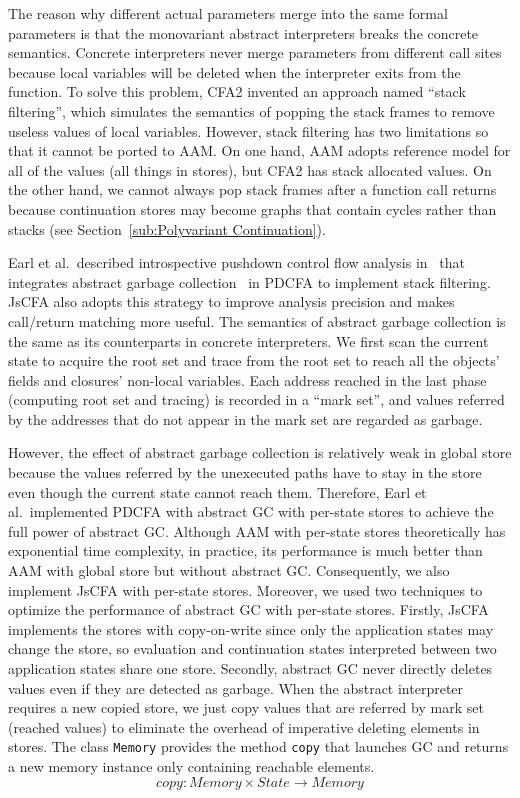 \documentclass[12pt]{report}
\begin{document}
The reason why different actual parameters merge into the same formal parameters is that the monovariant abstract interpreters breaks the concrete semantics. Concrete interpreters never merge parameters from different call sites because local variables will be deleted when the interpreter exits from the function.
To solve this problem, CFA2 invented an approach named ``stack filtering'', which simulates the semantics of popping the stack frames to remove useless values of local variables.
However, stack filtering has two limitations so that it cannot be ported to AAM\@. On one hand, AAM adopts reference model for all of the values (all things in stores), but CFA2 has stack allocated values.
On the other hand, we cannot always pop stack frames after a function call returns because continuation stores may become graphs that contain cycles rather than stacks (see Section~\ref{sub:Polyvariant Continuation}).

Earl et al.\ described introspective pushdown control flow analysis in~\cite{earl2012introspective} that integrates abstract garbage collection~\cite{might2006improving} in PDCFA to implement stack filtering.
JsCFA also adopts this strategy to improve analysis precision and makes call/return matching more useful.
The semantics of abstract garbage collection is the same as its counterparts in concrete interpreters.
We first scan the current state to acquire the root set and trace from the root set to reach all the objects' fields and closures' non-local variables. Each address reached in the last phase (computing root set and tracing) is recorded in a ``mark set'', and values referred by the addresses that do not appear in the mark set are regarded as garbage.

However, the effect of abstract garbage collection is relatively weak in global store because the values referred by the unexecuted paths have to stay in the store even though the current state cannot reach them.
Therefore, Earl et al.\ implemented PDCFA with abstract GC with per-state stores to achieve the full power of abstract GC\@.
Although AAM with per-state stores theoretically has exponential time complexity, in practice, its performance is much better than AAM with global store but without abstract GC\@.
Consequently, we also implement JsCFA with per-state stores. Moreover, we used two techniques to optimize the performance of abstract GC with per-state stores.
Firstly, JsCFA implements the stores with copy-on-write since only the application states may change the store, so evaluation and continuation states interpreted between two application states share one store.
Secondly, abstract GC never directly deletes values even if they are detected as garbage. When the abstract interpreter requires a new copied store, we just copy values that are referred by mark set (reached values) to eliminate the overhead of imperative deleting elements in stores.
The class \verb|Memory| provides the method \verb|copy| that launches GC and returns a new memory instance only containing reachable elements.
\[
copy: Memory \times State \to Memory
\]
\end{document}

